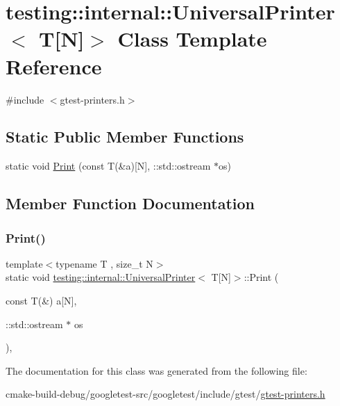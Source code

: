 \hypertarget{classtesting_1_1internal_1_1UniversalPrinter_3_01T[N]_4}{}\section{testing\+::internal\+::Universal\+Printer$<$ T\mbox{[}N\mbox{]}$>$ Class Template Reference}
\label{classtesting_1_1internal_1_1UniversalPrinter_3_01T[N]_4}


{\ttfamily \#include $<$gtest-\/printers.\+h$>$}

\subsection*{Static Public Member Functions}
\begin{DoxyCompactItemize}
\item 
static void \mbox{\hyperlink{classtesting_1_1internal_1_1UniversalPrinter_3_01T[N]_4_a1cf0e7c8db59c090f769116c6421b212}{Print}} (const T(\&a)\mbox{[}N\mbox{]}, \+::std\+::ostream $\ast$os)
\end{DoxyCompactItemize}


\subsection{Member Function Documentation}
\mbox{\label{classtesting_1_1internal_1_1UniversalPrinter_3_01T[N]_4_a1cf0e7c8db59c090f769116c6421b212}} 
\subsubsection{\texorpdfstring{Print()}{Print()}}
{\footnotesize\ttfamily template$<$typename T , size\+\_\+t N$>$ \\
static void \mbox{\hyperlink{classtesting_1_1internal_1_1UniversalPrinter}{testing\+::internal\+::\+Universal\+Printer}}$<$ T\mbox{[}N\mbox{]}$>$\+::Print (\begin{DoxyParamCaption}\item[{const T(\&)}]{a\mbox{[}\+N\mbox{]},  }\item[{\+::std\+::ostream $\ast$}]{os }\end{DoxyParamCaption})\hspace{0.3cm}{\ttfamily [inline]}, {\ttfamily [static]}}



The documentation for this class was generated from the following file\+:\begin{DoxyCompactItemize}
\item 
cmake-\/build-\/debug/googletest-\/src/googletest/include/gtest/\mbox{\hyperlink{gtest-printers_8h}{gtest-\/printers.\+h}}\end{DoxyCompactItemize}
